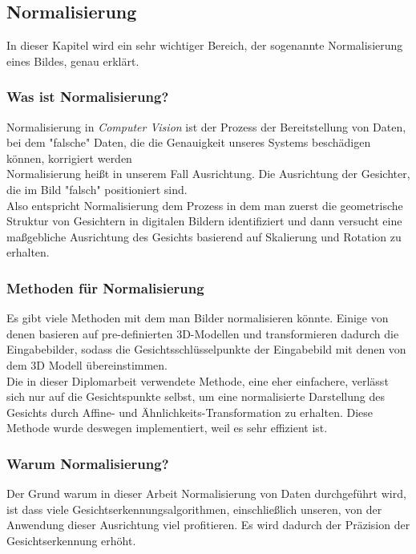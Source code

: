 \subsection{Normalisierung}

\label{normal}
\begin{flushleft}
	
	In dieser Kapitel wird ein sehr wichtiger Bereich, der sogenannte Normalisierung
	eines Bildes, genau erklärt. 
	
	\subsubsection{Was ist Normalisierung?}
	
	Normalisierung in \textit{Computer Vision} ist der Prozess der Bereitstellung
	von Daten, bei dem "falsche" Daten, die die Genauigkeit unseres Systems
	beschädigen können, korrigiert werden\\ 
	Normalisierung heißt in unserem Fall Ausrichtung. 
	Die Ausrichtung der Gesichter, die im Bild "falsch" positioniert sind. \\
	Also entspricht Normalisierung dem Prozess in dem man zuerst die geometrische
	Struktur von Gesichtern in digitalen Bildern identifiziert und dann versucht
	eine maßgebliche Ausrichtung des Gesichts basierend auf Skalierung und Rotation
	zu erhalten.
	\subsubsection{Methoden für Normalisierung}
	Es gibt viele Methoden mit dem man Bilder normalisieren könnte. 
	Einige von denen basieren auf pre-definierten 3D-Modellen und transformieren
	dadurch die Eingabebilder, sodass die Gesichtsschlüsselpunkte der Eingabebild
	mit denen von dem 3D Modell übereinstimmen.
	\\
	Die in dieser Diplomarbeit verwendete Methode, eine eher einfachere, verlässt
	sich nur auf die Gesichtspunkte selbst, um eine normalisierte Darstellung des
	Gesichts durch Affine- und Ähnlichkeits-Transformation zu erhalten.
	Diese Methode wurde deswegen implementiert, weil es sehr effizient ist.
	
	\subsubsection{Warum Normalisierung?}
	Der Grund warum in dieser Arbeit Normalisierung von Daten durchgeführt wird, ist
	dass viele Gesichtserkennungsalgorithmen, einschließlich unseren, von der
	Anwendung dieser Ausrichtung viel profitieren. 
	Es wird dadurch der Präzision der Gesichtserkennung erhöht. 
	

\end{flushleft}
